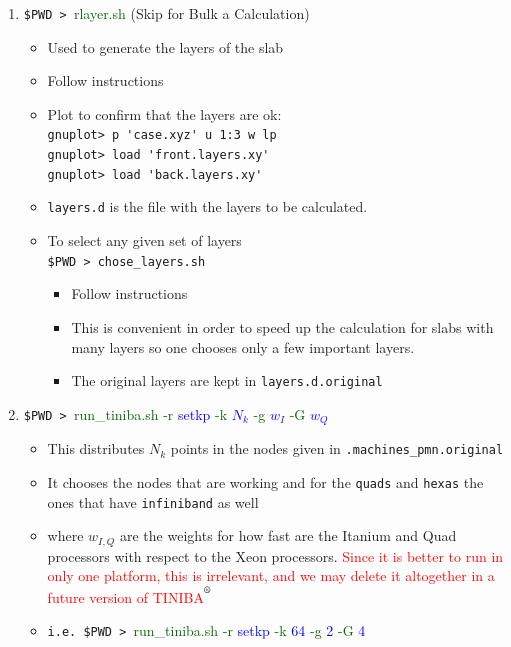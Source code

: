\documentclass[12pt,leqno]{article}
\def\reg{\textsuperscript{\textregistered}}
\numberwithin{equation}{section}
\begin{document}
\begin{enumerate}
\begin{itemize}
{This generates 64 $N_k$-points in the IBZ.
}
\end{itemize}
\item \verb=$PWD > =\textcolor{darkgreen}{rlayer.sh} (Skip for Bulk a Calculation)
\begin{itemize}
\item Used to generate the layers of the slab
\item Follow instructions
\item Plot to confirm that the layers are ok:\\
\verb=gnuplot> p 'case.xyz' u 1:3 w lp=\\
\verb=gnuplot> load 'front.layers.xy'=\\
\verb=gnuplot> load 'back.layers.xy'=
\item \verb=layers.d= is the file with the layers to be calculated.  
\item To select any given set of layers\\ 
\verb=$PWD > chose_layers.sh=
\begin{itemize}
\item Follow instructions
\item This is convenient in order to speed
 up the calculation for slabs with many
 layers so one chooses only a few important layers. 
\item The original layers are kept in \verb=layers.d.original=
\end{itemize}
\end{itemize}
\item \verb=$PWD > =\textcolor{darkgreen}{run\_tiniba.sh}
 \textcolor{darkgreen}{-r} \textcolor{blue}{setkp} 
 \textcolor{darkgreen}{-k} \textcolor{blue}{$N_k$} 
 \textcolor{darkgreen}{-g} \textcolor{blue}{$w_I$} 
 \textcolor{darkgreen}{-G} \textcolor{blue}{$w_Q$} 
\begin{itemize}
\item This distributes $N_k$ points in the nodes given in
  \verb=.machines_pmn.original=
\item It chooses the nodes that are working and for the \verb=quads=
  and \verb=hexas= the ones
  that have \verb=infiniband= as well
\item where $w_{I,Q}$ are the weights for how fast are the Itanium and Quad processors with respect to the Xeon processors.
\textcolor{red}{Since it is better to run in only one platform, this
  is irrelevant, and we may delete it altogether in a future version
  of TINIBA$^{\reg}$
}
\item
 \verb=i.e. $PWD > =\textcolor{darkgreen}{run\_tiniba.sh}
\textcolor{darkgreen}{-r} \textcolor{blue}{setkp} 
\textcolor{darkgreen}{-k} \textcolor{blue}{64} 
\textcolor{darkgreen}{-g} \textcolor{blue}{2} 
\textcolor{darkgreen}{-G} \textcolor{blue}{4} 


\end{itemize}
\end{enumerate}
\end{document}
